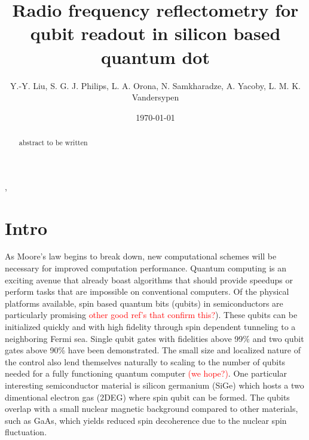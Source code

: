 \documentclass[]{article}
\begin{document}
	
\title{Radio frequency reflectometry for qubit readout in silicon based quantum dot},
\author{Y.-Y. Liu, S. G. J. Philips, L. A. Orona, N. Samkharadze, A. Yacoby, L. M. K. Vandersypen}

\date{\today}


\begin{abstract}
	abstract to be written
\end{abstract}

\maketitle

\section{Intro} %
	\label{sec:intro}
	As Moore’s law begins to break down, new computational schemes will be necessary for improved computation performance.  Quantum computing is an exciting avenue that already boast algorithms that should provide speedups or perform tasks that are impossible on conventional computers\cite{bravyi2018quantum,farhi2018classification,carleo2017solving,shor1999polynomial}.  Of the physical platforms available, spin based quantum bits (qubits) in semiconductors are particularly promising \cite{vandersypen2017interfacing} \textcolor{red}{other good ref's that confirm this?}).  These qubits can be initialized quickly and with high fidelity through spin dependent tunneling to a neighboring Fermi sea.  Single qubit gates with fidelities above 99\% and two qubit gates above 90\% have been demonstrated.  The small size and localized nature of the control also lend themselves naturally to scaling to the number of qubits needed for a fully functioning quantum computer\textcolor{red}{ (we hope?)}. One particular interesting semiconductor material is silicon germanium (SiGe) which hosts a two dimentional electron gas (2DEG) where spin qubit can be formed. The qubits overlap with a small nuclear magnetic background compared to other materials, such as GaAs, which yields reduced spin decoherence due to the nuclear spin fluctuation\cite{hanson2007spins}. 
\end{document}
